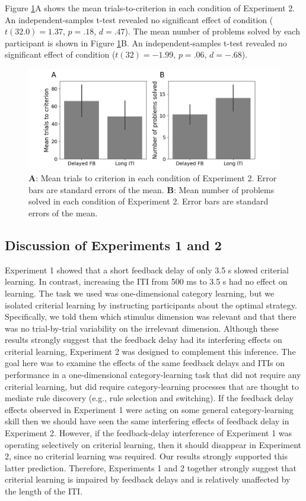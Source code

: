 \documentclass[doc, floatsintext]{apa7}
\begin{document}
Figure \ref{fig_exp_2_t2c}A shows the mean
trials-to-criterion in each condition of Experiment 2. An
independent-samples t-test revealed no significant effect of
condition ($t(32.0)=1.37$, $p = .18$, $d = .47$).  The mean
number of problems solved by each participant is shown in
Figure \ref{fig_exp_2_t2c}B. An independent-samples t-test
revealed no significant effect of condition ($t(32) =
-1.99$, $p = .06$, $d = -.68$).

\begin{figure}
  \centering
  \includegraphics[width=.8\textwidth]{../figures/fig_exp_2_t2c.png}
    \caption{
        \textbf{A}: Mean trials to criterion in each
        condition of Experiment 2. Error bars are standard
        errors of the mean.
        \textbf{B}: Mean number of problems solved in each
        condition of Experiment 2. Error bars are standard
        errors of the mean.
}
  \label{fig_exp_2_t2c}
\end{figure}

\subsection{Discussion of Experiments 1 and 2}
Experiment 1 showed that a short feedback delay of only 3.5
s slowed criterial learning. In contrast, increasing the ITI
from 500 ms to 3.5 s had no effect on learning. The task we
used was one-dimensional category learning, but we isolated
criterial learning by instructing participants about the
optimal strategy. Specifically, we told them which stimulus
dimension was relevant and that there was no trial-by-trial
variability on the irrelevant dimension. Although these
results strongly suggest that the feedback delay had its
interfering effects on criterial learning, Experiment 2 was
designed to complement this inference. The goal here was to
examine the effects of the same feedback delays and ITIs on
performance in a one-dimensional category-learning task that
did not require any criterial learning, but did require
category-learning processes that are thought to mediate rule
discovery (e.g., rule selection and switching). If the
feedback delay effects observed in Experiment 1 were acting
on some general category-learning skill then we should have
seen the same interfering effects of feedback delay in
Experiment 2. However, if the feedback-delay interference of
Experiment 1 was operating selectively on criterial
learning, then it should disappear in Experiment 2, since no
criterial learning was required.  Our results strongly
supported this latter prediction.  Therefore, Experiments 1
and 2 together strongly suggest that criterial learning is
impaired by feedback delays and is relatively unaffected by
the length of the ITI.
\end{document}
